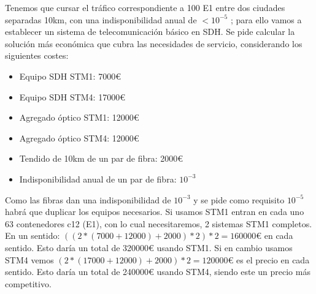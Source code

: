 \begin{exercise}[4]
	Tenemos que cursar el tráfico correspondiente a 100 E1 entre dos ciudades separadas 10km, con una indisponibilidad anual de $<10^{-5}$ ; para ello vamos a establecer un sistema de telecomunicación básico en SDH. Se pide calcular la solución más económica que cubra las necesidades de servicio, considerando los siguientes costes:
	\begin{itemize}
		\item Equipo SDH STM1: 7000€
		\item Equipo SDH STM4: 17000€
		\item Agregado óptico STM1: 12000€
		\item Agregado óptico STM4: 12000€
		\item Tendido de 10km de un par de fibra: 2000€
		\item Indisponibilidad anual de un par de fibra: $10^{-3}$
	\end{itemize}
	Como las fibras dan una indisponibilidad de $10^{-3}$ y se pide como requisito $10^{-5}$ habrá que duplicar los equipos necesarios. Si usamos STM1 entran en cada uno 63 contenedores c12 (E1), con lo cual necesitaremos, 2 sistemas STM1 completos. En un sentido: $((2*(7000+12000)+2000)*2)*2=160000€$ en cada sentido. Esto daría un total de 320000€ usando STM1. Si en cambio usamos STM4 vemos $(2*(17000+12000)+2000)*2=120000€$ es el precio en cada sentido. Esto daría un total de 240000€ usando STM4, siendo este un precio más competitivo.
\end{exercise}
